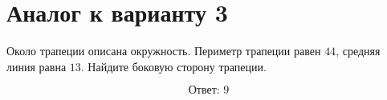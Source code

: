 \documentclass[12pt,a4paper]{article}
\begin{document}
\section*{Аналог к варианту 3}
Около трапеции описана окружность. Периметр трапеции равен \(44\), средняя линия равна \(13\). Найдите боковую сторону трапеции.
\begin{center}\figCyclicTrapezoid\end{center}
\[\boxed{\text{Ответ: }9}\]
\end{document}
